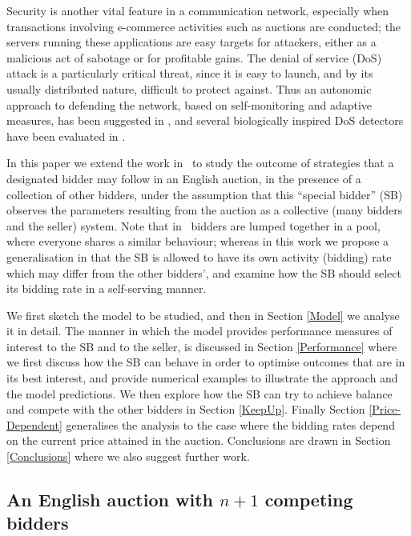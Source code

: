 \documentclass{article}
\begin{document}
Security is another vital feature in a communication network,
especially when transactions involving e-commerce activities such
as auctions are conducted; the servers running these applications
are easy targets for attackers, either as a malicious act of
sabotage or for profitable gains. The denial of service (DoS)
attack is a particularly critical threat, since it is easy to
launch, and by its usually distributed nature, difficult to
protect against. Thus an autonomic approach to defending the
network, based on self-monitoring and adaptive measures, has been
suggested in \cite{Gelenbe_Loukas07_SelfAwareDoS}, and several
biologically inspired DoS detectors have been evaluated in
\cite{Loukas_Oke_07, Loukas_Oke_LikelihoodRatios,Oke_etal07}.


In this paper we extend the work in~\cite{gelenbe06} to study the
outcome of strategies that a designated bidder may follow in an
English auction, in the presence of a collection of other bidders,
under the assumption that this ``special bidder'' (SB) observes
the parameters resulting from the auction as a collective (many
bidders and the seller) system. Note that in~\cite{gelenbe06}
bidders are lumped together in a pool, where everyone shares a
similar behaviour; whereas in this work we propose a
generalisation in that the SB is allowed to have its own activity
(bidding) rate which may differ from the other bidders', and
examine how the SB should select its bidding rate in a
self-serving manner.

We first sketch the model to be studied, and then in Section
\ref{Model} we analyse it in detail. The manner in which the model
provides performance measures of interest to the SB and to the
seller, is discussed in Section \ref{Performance} where we first
discuss how the SB can behave in order to optimise outcomes that
are in its best interest, and provide  numerical examples to
illustrate the approach and the model predictions. We then explore
how the SB can try to achieve balance and compete with the other
bidders in Section \ref{KeepUp}. Finally Section
\ref{Price-Dependent} generalises the analysis to the case where
the bidding rates depend on the current price attained in the
auction. Conclusions are drawn in Section \ref{Conclusions} where
we also suggest further work.



\subsection{An English auction with $n+1$ competing bidders}\label{Sec:FirstModel}
\end{document}
